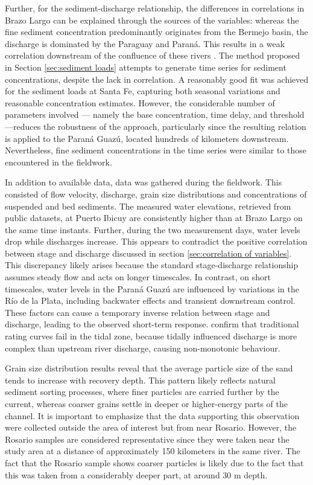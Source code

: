 Further, for the sediment-discharge relationship, the differences in correlations in Brazo Largo can be explained through the sources of the variables: whereas the fine sediment concentration predominantly originates from the Bermejo basin, the discharge is dominated by the Paraguay and Paraná. This results in a weak correlation downstream of the confluence of these rivers \autocite{lopezweibelSourcesTemporalDynamics2022}. The method proposed in Section \ref{sec:sediment loads} attempts to generate time series for sediment concentrations, despite the lack in correlation. A reasonably good fit was achieved for the sediment loads at Santa Fe, capturing both seasonal variations and reasonable concentration estimates. However, the considerable number of parameters involved — namely the base concentration, time delay, and threshold —reduces the robustness of the approach, particularly since the resulting relation is applied to the Paraná Guazú, located hundreds of kilometers downstream. Nevertheless, fine sediment concentrations in the time series were similar to those encountered in the fieldwork.

In addition to available data, data was gathered during the fieldwork. This consisted of flow velocity, discharge, grain size distributions and concentrations of suspended and bed sediments. The measured water elevations, retrieved from public datasets, at Puerto Ibicuy are consistently higher than at Brazo Largo on the same time instants. Further, during the two measurement days, water levels drop while discharges increase. This appears to contradict the positive correlation between stage and discharge discussed in section \ref{sec:correlation of variables}. This discrepancy likely arises because the standard stage-discharge relationship assumes steady flow and acts on longer timescales. In contrast, on short timescales, water levels in the Paraná Guazú are influenced by variations in the Río de la Plata, including backwater effects and transient downstream control. These factors can cause a temporary inverse relation between stage and discharge, leading to the observed short-term response. \textcite{jonesExpandedRatingCurve2019} confirm that traditional rating curves fail in the tidal zone, because tidally influenced discharge is more complex than upstream river discharge, causing non-monotonic behaviour. 

Grain size distribution results reveal that the average particle size of the sand tends to increase with recovery depth. This pattern likely reflects natural sediment sorting processes, where finer particles are carried further by the current, whereas coarser grains settle in deeper or higher-energy parts of the channel. It is important to emphasize that the data supporting this observation were collected outside the area of interest but from near Rosario. However, the Rosario samples are considered representative since they were taken near the study area at a distance of approximately 150 kilometers in the same river. The fact that the Rosario sample shows coarser particles is likely due to the fact that this was taken from a considerably deeper part, at around 30 m depth. 

